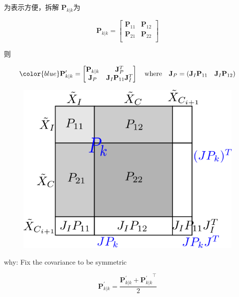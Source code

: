 \documentclass[12pt,a4paper]{article}
\begin{document}
为表示方便，拆解 $\mathbf{P}_{k|k}$为

\begin{equation}
\mathbf{P}_{k|k} =
\begin{bmatrix}
\mathbf{P}_{11} & \mathbf{P}_{12} \\
\mathbf{P}_{21} & \mathbf{P}_{22} \\
\end{bmatrix}
\end{equation}

则

\begin{equation}
{\color{blue}
\mathbf{P}_{k|k}^{\prime} =
\begin{bmatrix}
\mathbf{P}_{k|k} & \mathbf{J}_P^T \\
\mathbf{J}_P & \mathbf{J}_I \mathbf{P}_{11} \mathbf{J}_I^T
\end{bmatrix}
\quad \text{where} \quad
\mathbf{J}_P = \left(\mathbf{J}_I \mathbf{P}_{11} \quad \mathbf{J}_I \mathbf{P}_{12}\right)
}
\end{equation}

\begin{figure}[!htbp]
\centering
\includegraphics[scale=0.45]{images/visual_conv_augmentation.png}
\end{figure}

{\color{red}why: Fix the covariance to be symmetric}

\begin{equation}
\mathbf{P}_{k|k}^{\prime} = 
\frac{\mathbf{P}_{k|k}^{\prime} + {\mathbf{P}_{k|k}^{\prime}}^{\top}}{2}
\end{equation}
\end{document}
